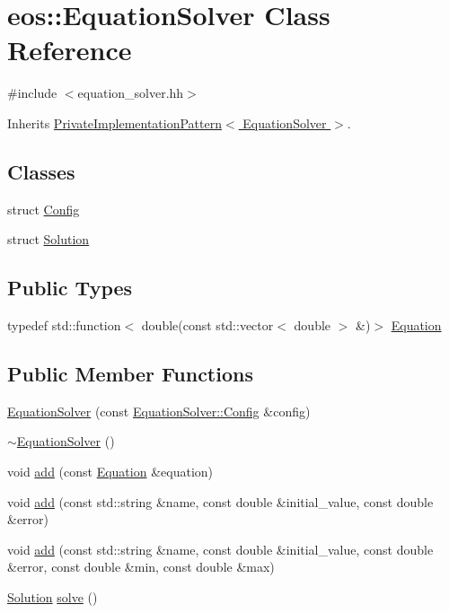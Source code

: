 \hypertarget{classeos_1_1EquationSolver}{
\section{eos::EquationSolver Class Reference}
\label{classeos_1_1EquationSolver}
}


{\ttfamily \#include $<$equation\_\-solver.hh$>$}

Inherits \hyperlink{classeos_1_1PrivateImplementationPattern}{PrivateImplementationPattern$<$ EquationSolver $>$}.\subsection*{Classes}
\begin{DoxyCompactItemize}
\item 
struct \hyperlink{structeos_1_1EquationSolver_1_1Config}{Config}
\item 
struct \hyperlink{structeos_1_1EquationSolver_1_1Solution}{Solution}
\end{DoxyCompactItemize}
\subsection*{Public Types}
\begin{DoxyCompactItemize}
\item 
typedef std::function$<$ double(const std::vector$<$ double $>$ \&)$>$ \hyperlink{classeos_1_1EquationSolver_a7394803ea85312852151a700b59da572}{Equation}
\end{DoxyCompactItemize}
\subsection*{Public Member Functions}
\begin{DoxyCompactItemize}
\item 
\hyperlink{classeos_1_1EquationSolver_a39179766f370890b207dd9c00f0009b8}{EquationSolver} (const \hyperlink{structeos_1_1EquationSolver_1_1Config}{EquationSolver::Config} \&config)
\item 
\hyperlink{classeos_1_1EquationSolver_ac96461e85b095b1bff966a0d07542310}{$\sim$EquationSolver} ()
\item 
void \hyperlink{classeos_1_1EquationSolver_ad9cc623f54250dca0cc3fd288dcede77}{add} (const \hyperlink{classeos_1_1EquationSolver_a7394803ea85312852151a700b59da572}{Equation} \&equation)
\item 
void \hyperlink{classeos_1_1EquationSolver_ad6d72a4680c5c5f6bea52fc25faa931f}{add} (const std::string \&name, const double \&initial\_\-value, const double \&error)
\item 
void \hyperlink{classeos_1_1EquationSolver_a616986b11e89a331af2b21a1fe8f3ce2}{add} (const std::string \&name, const double \&initial\_\-value, const double \&error, const double \&min, const double \&max)
\item 
\hyperlink{structeos_1_1EquationSolver_1_1Solution}{Solution} \hyperlink{classeos_1_1EquationSolver_ad9add1a035d5edff206361db0d050a44}{solve} ()
\end{DoxyCompactItemize}


